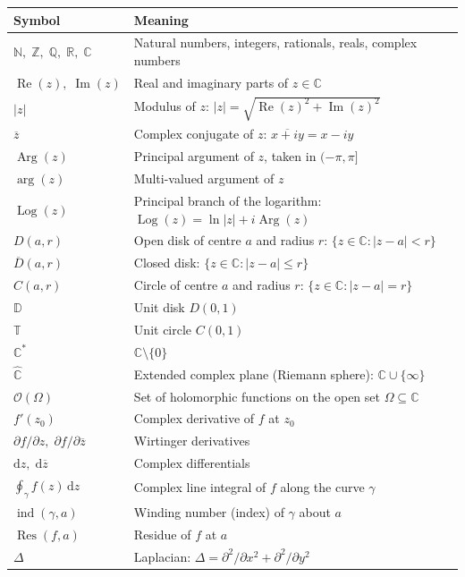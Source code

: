 \documentclass[12pt,a4paper,openany]{book}
\theoremstyle{definition}
\theoremstyle{plain}
\theoremstyle{remark}
\newcommand{\C}{\mathbb{C}}
\newcommand{\R}{\mathbb{R}}
\newcommand{\Z}{\mathbb{Z}}
\newcommand{\N}{\mathbb{N}}
\newcommand{\Q}{\mathbb{Q}}
\newcommand{\D}{\mathbb{D}}
\newcommand{\T}{\mathbb{T}}
\DeclareMathOperator{\re}{Re}
\DeclareMathOperator{\im}{Im}
\DeclareMathOperator{\Arg}{Arg}
\DeclareMathOperator{\Log}{Log}
\DeclareMathOperator{\Res}{Res}
\DeclareMathOperator{\ind}{ind}
\newcommand{\dd}{\mathrm{d}}
\newcommand{\abs}[1]{\left|#1\right|}
\newcommand{\conj}[1]{\overline{#1}}
\begin{document}
\begin{tabular}{@{}ll@{}}
\toprule
\textbf{Symbol} & \textbf{Meaning} \\
\midrule
$\N,\;\Z,\;\Q,\;\R,\;\C$ & Natural numbers, integers, rationals, reals, complex numbers \\
$\re(z),\;\im(z)$ & Real and imaginary parts of $z\in\C$ \\
$\abs{z}$ & Modulus of $z$: $\abs{z}=\sqrt{\re(z)^2+\im(z)^2}$ \\
$\conj{z}$ & Complex conjugate of $z$: $\conj{x+iy}=x-iy$ \\
$\Arg(z)$ & Principal argument of $z$, taken in $(-\pi,\pi]$ \\
$\arg(z)$ & Multi-valued argument of $z$ \\
$\Log(z)$ & Principal branch of the logarithm: $\Log(z)=\ln\abs{z}+i\Arg(z)$ \\
$D(a,r)$ & Open disk of centre $a$ and radius $r$: $\{z\in\C:\abs{z-a}<r\}$ \\
$\conj{D}(a,r)$ & Closed disk: $\{z\in\C:\abs{z-a}\leq r\}$ \\
$C(a,r)$ & Circle of centre $a$ and radius $r$: $\{z\in\C:\abs{z-a}=r\}$ \\
$\D$ & Unit disk $D(0,1)$ \\
$\T$ & Unit circle $C(0,1)$ \\
$\C^*$ & $\C\setminus\{0\}$ \\
$\hat{\C}$ & Extended complex plane (Riemann sphere): $\C\cup\{\infty\}$ \\
$\mathscr{O}(\Omega)$ & Set of holomorphic functions on the open set $\Omega\subseteq\C$ \\
$f'(z_0)$ & Complex derivative of $f$ at $z_0$ \\
$\partial f/\partial z,\;\partial f/\partial\conj{z}$ & Wirtinger derivatives \\
$\dd z,\;\dd\conj{z}$ & Complex differentials \\
$\oint_\gamma f(z)\,\dd z$ & Complex line integral of $f$ along the curve $\gamma$ \\
$\ind(\gamma,a)$ & Winding number (index) of $\gamma$ about $a$ \\
$\Res(f,a)$ & Residue of $f$ at $a$ \\
$\Delta$ & Laplacian: $\Delta=\partial^2/\partial x^2+\partial^2/\partial y^2$ \\
\bottomrule
\end{tabular}

\tableofcontents
\end{document}
